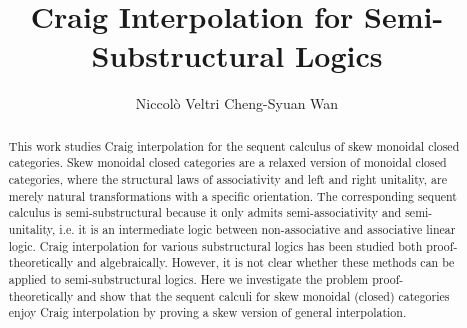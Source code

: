 \documentclass[submission,copyright,creativecommons]{eptcs}
\title{Craig Interpolation for Semi-{S}ubstructural Logics}
\author{
Niccol{\`o} Veltri \qquad\qquad Cheng-Syuan Wan
\institute{Tallinn University of Technology, Estonia}
\email{\quad niccolo@cs.ioc.ee \quad\qquad cswan@cs.ioc.ee}
}
\theoremstyle{definition}
\begin{document}
\maketitle
\begin{abstract}
This work studies Craig interpolation for the sequent calculus of skew monoidal closed categories.
Skew monoidal closed categories are a relaxed version of monoidal closed categories, where the structural laws of associativity and left and right unitality, are merely natural transformations with a specific orientation.
The corresponding sequent calculus is semi-substructural because it only admits semi-associativity and semi-unitality, i.e. it is an intermediate logic between non-associative and associative linear logic.
Craig interpolation for various substructural logics has been studied both proof-theoretically and algebraically.
However, it is not clear whether these methods can be applied to semi-substructural logics.
Here we investigate the problem proof-theoretically and show that the sequent calculi for skew monoidal (closed) categories enjoy Craig interpolation by proving a skew version of general interpolation.


\end{abstract}
\end{document}
